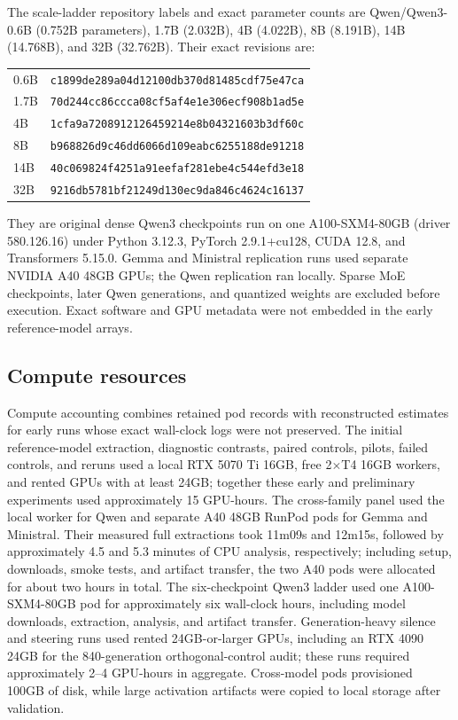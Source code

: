 \documentclass{article}
\begin{document}
The scale-ladder repository labels and exact parameter counts are Qwen/Qwen3-
0.6B (0.752B parameters), 1.7B (2.032B), 4B (4.022B), 8B (8.191B), 14B
(14.768B), and 32B (32.762B). Their exact revisions are:
\begin{center}
\footnotesize
\begin{tabular}{ll}
0.6B & \texttt{c1899de289a04d12100db370d81485cdf75e47ca} \\
1.7B & \texttt{70d244cc86ccca08cf5af4e1e306ecf908b1ad5e} \\
4B & \texttt{1cfa9a7208912126459214e8b04321603b3df60c} \\
8B & \texttt{b968826d9c46dd6066d109eabc6255188de91218} \\
14B & \texttt{40c069824f4251a91eefaf281ebe4c544efd3e18} \\
32B & \texttt{9216db5781bf21249d130ec9da846c4624c16137}
\end{tabular}
\end{center}
They are original dense Qwen3 checkpoints run on one A100-SXM4-80GB (driver
580.126.16) under Python
3.12.3, PyTorch 2.9.1+cu128, CUDA 12.8, and Transformers 5.15.0. Gemma and
Ministral replication runs used separate NVIDIA A40 48GB GPUs; the Qwen
replication ran locally. Sparse MoE checkpoints, later Qwen generations, and
quantized weights are excluded before execution. Exact software and GPU
metadata were not embedded in the early reference-model arrays.

\subsection{Compute resources}

Compute accounting combines retained pod records with reconstructed estimates
for early runs whose exact wall-clock logs were not preserved. The initial
reference-model extraction, diagnostic contrasts, paired controls, pilots,
failed controls, and reruns used a local RTX 5070 Ti 16GB, free 2$\times$T4
16GB workers, and rented GPUs with at least 24GB; together these early and
preliminary experiments used approximately 15 GPU-hours. The cross-family
panel used the local worker for Qwen and separate A40 48GB RunPod pods for Gemma and
Ministral. Their measured full extractions took 11m09s and 12m15s, followed by
approximately 4.5 and 5.3 minutes of CPU analysis, respectively; including
setup, downloads, smoke tests, and artifact transfer, the two A40 pods were
allocated for about two hours in total. The six-checkpoint Qwen3 ladder used one
A100-SXM4-80GB pod for approximately six wall-clock hours, including model
downloads, extraction, analysis, and artifact transfer. Generation-heavy
silence and steering runs used rented 24GB-or-larger GPUs, including an RTX
4090 24GB for the 840-generation orthogonal-control audit; these runs required
approximately 2--4 GPU-hours in aggregate. Cross-model pods provisioned 100GB
of disk, while large activation artifacts were copied to local storage after
validation.
\end{document}
